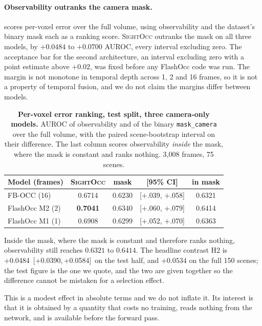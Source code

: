 \documentclass[10pt,twocolumn,letterpaper]{article}
\newcommand{\Hii}{+0.0484}
\newcommand{\HiiCI}{[+0.0390,\,+0.0584]}
\begin{document}
\paragraph{Observability outranks the camera mask.}
\label{sec:h2}
 scores per-voxel error over the full volume, using
observability and the dataset's binary mask each as a ranking score.
\textsc{SightOcc} outranks the mask on all three models, by $+0.0484$ to
$+0.0700$ AUROC, every interval excluding zero. The acceptance bar for the
second architecture, an interval excluding zero with a point estimate above
$+0.02$, was fixed before any FlashOcc code was run. The margin is not
monotone in temporal depth across 1, 2 and 16 frames, so it is not a
property of temporal fusion, and we do not claim the margins differ between
models.

\begin{table}[t]
\centering\small
\begin{tabular}{lcccc}
\toprule
Model (frames) & \textsc{SightOcc} & mask & [95\% CI] & in mask \\
\midrule
FB-OCC (16)      & 0.6714 & 0.6230 & [$+$.039, $+$.058] & 0.6321 \\
FlashOcc M2 (2)  & \textbf{0.7041} & 0.6340 & [$+$.060, $+$.079] & 0.6414 \\
FlashOcc M1 (1)  & 0.6908 & 0.6299 & [$+$.052, $+$.070] & 0.6363 \\
\bottomrule
\end{tabular}
\caption{\textbf{Per-voxel error ranking, test split, three camera-only
models.} AUROC of observability and of the binary \texttt{mask\_camera}
over the full volume, with the paired scene-bootstrap interval on their
difference. The last column scores observability \emph{inside} the mask,
where the mask is constant and ranks nothing. 3{,}008 frames, 75 scenes.}
\label{tab:maskcmp}
\end{table}

Inside the mask, where the mask is constant and therefore ranks nothing,
observability still reaches $0.6321$ to $0.6414$. The headline contrast H2
is \Hii\ \HiiCI\ on the test half, and $+0.0534$ on the full 150 scenes;
the test figure is the one we quote, and the two are given together so the
difference cannot be mistaken for a selection effect.

This is a modest effect in absolute terms and we do not inflate it. Its
interest is that it is obtained by a quantity that costs no training, reads
nothing from the network, and is available before the forward pass.
\end{document}
